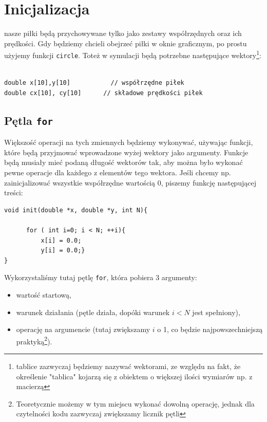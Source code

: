 \documentclass{instrukcja}
\begin{document}
\section {Inicjalizacja}
nasze piłki będą przychowywane tylko jako zestawy współrzędnych oraz ich prędkości. Gdy będziemy chcieli obejrzeć piłki w oknie graficznym, po prostu użyjemy funkcji \verb|circle|. Toteż w symulacji będą potrzebne następujące wektory\footnote{tablice zazwyczaj będziemy nazywać wektorami, ze względu na fakt, że określenie "tablica" kojarzą się z obiektem o większej ilości wymiarów np. z macierzą}:
\begin{verbatim} 

double x[10],y[10]           // współrzędne piłek
double cx[10], cy[10]      // składowe prędkości piłek

\end{verbatim}

\subsection* {Pętla {\tt for}}

Większość operacji na tych zmiennych będziemy wykonywać, używając funkcji, które będą przyjmować wprowadzone wyżej wektory jako argumenty. Funkcje będą musiały mieć podaną długość wektorów tak, aby można było wykonać pewne operacje dla każdego z elementów tego wektora.
Jeśli chcemy np. zainicjalizować wszystkie współrzędne wartością \(0\), piszemy funkcję następującej treści:

\begin{verbatim}
void init(double *x, double *y, int N){

      for ( int i=0; i < N; ++i){
          x[i] = 0.0;
          y[i] = 0.0;}
}
\end{verbatim}



Wykorzystaliśmy tutaj pętlę \verb|for|, która pobiera 3 argumenty:
\begin{itemize}
\item wartość startową,
\item warunek działania (pętle działa, dopóki warunek \(i<N\) jest spełniony),
\item operację na argumencie (tutaj zwiększamy \(i\) o 1, co będzie najpowszechniejszą praktyką\footnote{Teoretycznie możemy w tym miejscu wykonać dowolną operację, jednak dla czytelności kodu zazwyczaj zwiększamy licznik pętli}).
\end{itemize}
\end{document}
